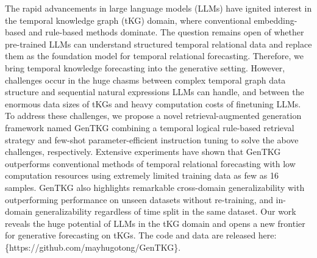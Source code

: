 The rapid advancements in large language models (LLMs) have ignited interest in the temporal knowledge graph (tKG) domain, where conventional embedding-based and rule-based methods dominate. The question remains open of whether pre-trained LLMs can understand structured temporal relational data and replace them as the foundation model for temporal relational forecasting. Therefore, we bring temporal knowledge forecasting into the generative setting. However, challenges occur in the huge chasms between complex temporal graph data structure and sequential natural expressions LLMs can handle, and between the enormous data sizes of tKGs and heavy computation costs of finetuning LLMs. To address these challenges, we propose a novel retrieval-augmented generation framework named GenTKG combining a temporal logical rule-based retrieval strategy and few-shot parameter-efficient instruction tuning to solve the above challenges, respectively. Extensive experiments have shown that GenTKG outperforms conventional methods of temporal relational forecasting with low computation resources using extremely limited training data as few as 16 samples. GenTKG also highlights remarkable cross-domain generalizability with outperforming performance on unseen datasets without re-training, and in-domain generalizability regardless of time split in the same dataset. Our work reveals the huge potential of LLMs in the tKG domain and opens a new frontier for generative forecasting on tKGs. The code and data are released here:  \{https://github.com/mayhugotong/GenTKG\}.